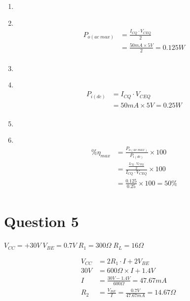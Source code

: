 \documentclass[11pt]{article}
\newcommand\Item[1][]{%
  \ifx\relax#1\relax  \item \else \item[#1] \fi
  \abovedisplayskip=0pt\abovedisplayshortskip=0pt~\vspace*{-\baselineskip}}
\begin{document}
  \begin{enumerate}[label=\roman*)]
    \Item %
      \begin{align*}
        P_{o(ac \; max)} &= \frac{I_{CQ}{\cdot}V_{CEQ}}{2} \\
        &= \frac{50mA{\times}5V}{2} = 0.125W \\
      \end{align*}
    \Item %
      \begin{align*}
        P_{i(dc)} &= I_{CQ}{\cdot}V_{CEQ} \\
        &= 50mA{\times}5V = 0.25W \\
      \end{align*}
    \Item %
      \begin{align*}
        \% \eta_{max} &=  \frac{P_{o(ac \; max)}}{P_{i(dc)}} \times 100 \\
        &= \frac{\frac{I_{CQ}{\cdot}V_{CEQ}}{2}}{I_{CQ}{\cdot}V_{CEQ}} \times 100 \\
        &= \frac{0.125}{0.25} \times 100 = 50\% \\
      \end{align*}
  \end{enumerate}
  
  \newpage
\section*{Question 5}
  $V_{CC} = +30V \; V_{BE} = 0.7V \; R_{1} = 300\Omega \; R_L = 16\Omega$\
  
  \begin{align*}
    V_{CC} &= 2R_{1}{\cdot}I + 2V_{BE} \\
    30V &= 600\Omega \times I + 1.4V \\
    I &= \frac{30V-1.4V}{600\Omega} = 47.67mA \\
    R_{2} &= \frac{V_{BE}}{I} = \frac{0.7V}{47.67mA} = 14.67\Omega  \\
  \end{align*}
\end{document}
